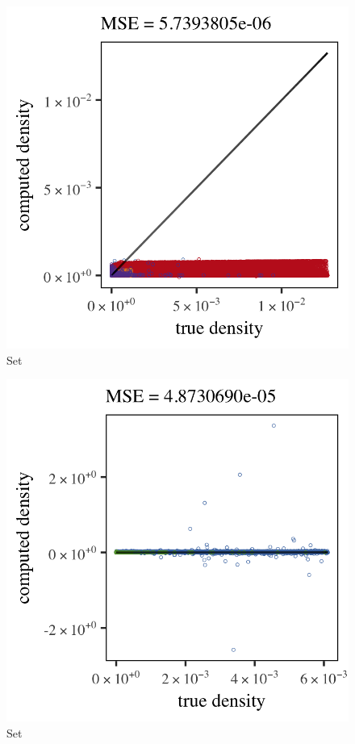 \begin{subfigure}{0.3\textwidth}
	\centering
	\includegraphics[keepaspectratio=true, width=\textwidth, height=0.23\textheight]{4/img/results_ferdosi_3_1200000_sambe_breiman}
	\caption{Set \ferdosiThree}
	\label{fig:4:simulated:datasets:sambe:ferdosi3}
\end{subfigure}		
\begin{subfigure}{0.3\textwidth}
	\centering
	\includegraphics[keepaspectratio=true, width=\textwidth, height=0.23\textheight]{4/img/results_baakman_1_600000_sambe_breiman}
	\caption{Set \baakmanOne}
	\label{fig:4:simulated:datasets:sambe:baakman1}
\end{subfigure}
